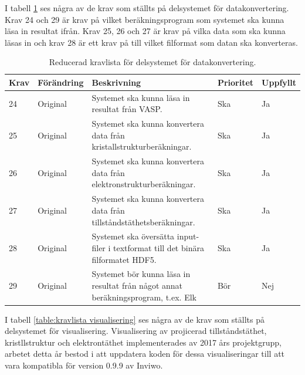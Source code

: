 \documentclass[a4paper,12pt]{article}
\begin{document}
I tabell \ref{table:kravlista datakonvertering} ses några av de krav som ställts på delsystemet för datakonvertering. Krav 24 och 29 är krav på vilket beräkningsprogram som systemet ska kunna läsa in resultat ifrån. Krav 25, 26 och 27 är krav på vilka data som ska kunna läsas in och krav 28 är ett krav på till vilket filformat som datan ska konverteras. 
\begin{table}[H]
\caption{Reducerad kravlista för delsystemet för datakonvertering.}
\begin{center}
\begin{tabular}{ |p{10mm}|p{20mm}|p{70mm}|p{15mm}|p{15mm}|}
\hline
 \textbf{Krav} & \textbf{Förändring} & \textbf{Beskrivning} & \textbf{Prioritet} & \textbf{Uppfyllt}  \\ 
\hline
24 & Original & Systemet ska kunna läsa in resultat från VASP. & Ska & Ja \\
\hline
25 & Original & Systemet ska kunna konvertera data från kristallstrukturberäkningar. & Ska & Ja \\
\hline
26 & Original & Systemet ska kunna konvertera data från elektronstrukturberäkningar. & Ska & Ja \\
\hline
27 & Original & Systemet ska kunna konvertera data från tillståndstäthetsberäkningar. & Ska & Ja \\
\hline
28 & Original & Systemet ska översätta input-filer i textformat till det binära filformatet HDF5. & Ska & Ja \\
\hline
29 & Original & Systemet bör kunna läsa in resultat från något annat beräkningsprogram, t.ex. Elk & Bör & Nej \\
\hline
\end{tabular}
\label{table:kravlista datakonvertering}
\end{center}
\end{table}


I tabell \ref{table:kravlista visualisering} ses några av de krav som ställts på delsystemet för visualisering. Visualisering av projicerad tillståndstäthet, kristllstruktur och elektrontäthet implementerades av 2017 års projektgrupp, arbetet detta år bestod i att uppdatera koden för dessa visualiseringar till att vara kompatibla för version 0.9.9 av Inviwo. 
\end{document}
